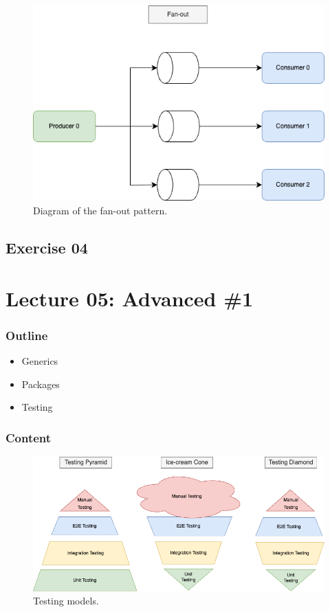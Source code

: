 \documentclass[
  digital,
  color,
  oneside,
  nosansbold,
  nocolorbold,
  lof,
  lot,
]{fithesis4}
\begin{document}
\begin{figure}[H]
    \centering
    \includegraphics[width=12cm]{figures/fanout.png}
    \caption{Diagram of the fan-out pattern.}
\end{figure}

\subsection{Exercise 04}

\section{Lecture 05: Advanced \#1}

\subsubsection{Outline}

\begin{itemize}
    \item Generics
    \item Packages
    \item Testing
\end{itemize}

\subsubsection{Content}

\begin{figure}[H]
    \centering
    \includegraphics[width=12cm]{figures/pyramids.png}
    \caption{Testing models.}
\end{figure}
\end{document}
